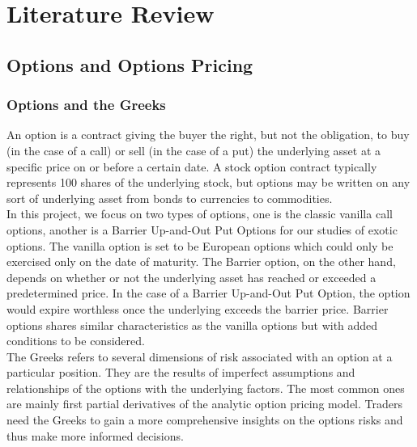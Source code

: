 \documentclass{report}
\begin{document}
\chapter{Literature Review}

\section{Options and Options Pricing}

\subsection{Options and the Greeks}
An option is a contract giving the buyer the right, but not the obligation, to buy (in the case of a call) or sell (in the case of a put) the underlying asset at a specific price on or before a certain date. A stock option contract typically represents 100 shares of the underlying stock, but options may be written on any sort of underlying asset from bonds to currencies to commodities. \\
In this project, we focus on two types of options, one is the classic vanilla call options, another is a Barrier Up-and-Out Put Options for our studies of exotic options. The vanilla option is set to be European options which could only be exercised only on the date of maturity. The Barrier option, on the other hand, depends on whether or not the underlying asset has reached or exceeded a predetermined price. In the case of a Barrier Up-and-Out Put Option, the option would expire worthless once the underlying exceeds the barrier price. Barrier options shares similar characteristics as the vanilla options but with added conditions to be considered. \\
The Greeks refers to several dimensions of risk associated with an option at a particular position. They are the results of imperfect assumptions and relationships of the options with the underlying factors. The most common ones are mainly first partial derivatives of the analytic option pricing model. Traders need the Greeks to gain a more comprehensive insights on the options risks and thus make more informed decisions.
\end{document}
